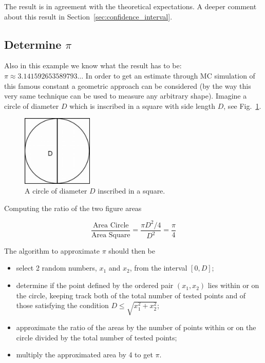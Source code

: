 The result is in agreement with the theoretical expectations. A deeper comment about this result in Section~\ref{sec:confidence_interval}.

\subsection{Determine \(\pi\)}
\label{determine-pi}

Also in this example we know what the result has to be: \(\pi\approx 3.141592653589793\ldots\) In order to get an estimate through MC simulation of this famous constant a geometric approach can be considered (by the way this very same technique can be used to measure any arbitrary shape). Imagine a circle of diameter \(D\) which is inscribed in a square with side length \(D\), see Fig.~\ref{fig:circle_inscribed}.

\begin{figure}[htb]
\centering
\includegraphics[width=0.3\textwidth]{figures/circle_inscribed.jpeg}
\caption{A circle of diameter $D$ inscribed in a square.}
\label{fig:circle_inscribed}
\end{figure}

Computing the ratio of the two figure areas

\begin{equation}
\frac{\textrm{Area Circle}}{\textrm{Area Square}} = \frac{\pi D^2/4}{D^2} = \frac{\pi}{4} 
\end{equation}

The algorithm to approximate \(\pi\) should then be

\begin{itemize}
\item select 2 random numbers, \(x_1\) and \(x_2\), from the interval
\([0,D]\); 
\item determine if the point defined by the ordered pair \((x_1, x_2)\) lies within or on the circle, keeping track both of the total number of tested points and of those satisfying the condition \(D \le\sqrt{x_1^2 + x_2^2}\); 
\item approximate the ratio of the areas by the number of points within or on the circle divided by the total number of tested points; 
\item multiply the approximated area by 4 to get \(\pi\).
\end{itemize}

